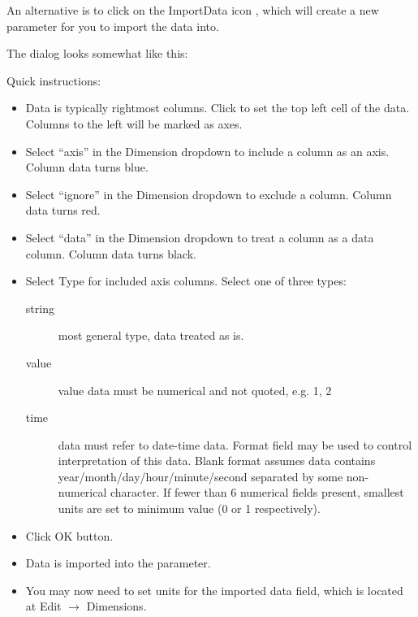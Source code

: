 An alternative is to click on the ImportData icon
, which will create a new parameter for you
to import the data into.

The dialog looks somewhat like this:

\begin{center}
\end{center}

Quick instructions:
\begin{itemize}
\item Data is typically rightmost columns. Click to set the top left
  cell of the data. Columns to the left will be marked as axes.
\item Select ``axis'' in the Dimension dropdown to include a column as
  an axis. Column data turns blue.
\item Select ``ignore'' in the Dimension dropdown to exclude a
  column. Column data turns red.
\item Select ``data'' in the Dimension dropdown to treat a column as a
  data column. Column data turns black.
\item Select Type for included axis columns. Select one of three
  types:
  \begin{description}
  \item[string] most general type, data treated as is.
  \item[value] value data must be numerical and not quoted, e.g. 1, 2
  \item[time] data must refer to date-time data. Format field may be
    used to control interpretation of this data. Blank format assumes
    data contains year/month/day/hour/minute/second separated by some
    non-numerical character. If fewer than 6 numerical fields present,
    smallest units are set to minimum value (0 or 1 respectively).
  \end{description}
\item Click OK button.
\item Data is imported into the parameter.
\item You may now need to set units for the imported data field, which
  is located at Edit $\rightarrow$ Dimensions.
\end{itemize}


